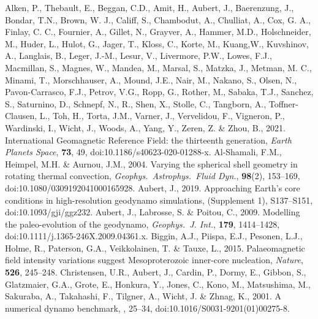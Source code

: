 \begin{thebibliography}{}
%
Alken, P., Thebault, E., Beggan, C.D., Amit, H., Aubert, J., Baerenzung, J., Bondar, T.N., Brown, W. J., Califf, S., Chambodut, A., Chulliat, A., Cox, G. A., Finlay, C. C., Fournier, A., Gillet, N., Grayver, A., Hammer, M.D., Holschneider, M., Huder, L., Hulot, G., Jager, T., Kloss, C., Korte, M., Kuang,W., Kuvshinov, A., Langlais, B., Leger, J.-M., Lesur, V., Livermore, P.W., Lowes, F.J., Macmillan, S., Magnes, W., Mandea, M., Marsal, S., Matzka, J., Metman, M. C., Minami, T., Morschhauser, A., Mound, J.E., Nair, M., Nakano, S., Olsen, N., Pavon-Carrasco, F.J., Petrov, V.G., Ropp, G., Rother, M., Sabaka, T.J., Sanchez, S., Saturnino, D., Schnepf, N., R., Shen, X., Stolle, C., Tangborn, A., Toffner-Clausen, L., Toh, H., Torta, J.M., Varner, J., Vervelidou, F., Vigneron, P., Wardinski, I., Wicht, J., Woods, A., Yang, Y., Zeren, Z. \& Zhou, B., 2021. International Geomagnetic Reference Field: the thirteenth generation, {\it Earth Planets Space}, {\bf 73}, 49, doi:10.1186/s40623-020-01288-x.
%
Al-Shamali, F.M., Heimpel, M.H. \& Aurnou, J.M., 2004. Varying the spherical shell geometry in rotating thermal convection, {\it Geophys.\  Astrophys.\ Fluid Dyn.}, {\bf 98}(2), 153--169, doi:10.1080/0309192041000165928.
%
Aubert, J., 2019. Approaching Earth's core conditions in high-resolution geodynamo simulations, (Supplement 1), S137--S151, doi:10.1093/gji/ggz232.
%
Aubert, J., Labrosse, S. \& Poitou, C., 2009. Modelling the paleo-evolution of the geodynamo, {\it Geophys.\ J. Int.}, {\bf 179}, 1414--1428, doi:10.1111/j.1365-246X.2009.04361.x.
%
Biggin, A.J., Piispa, E.J., Pesonen, L.J., Holme, R., Paterson, G.A., Veikkolainen, T. \& Tauxe, L., 2015. Palaeomagnetic field intensity variations suggest Mesoproterozoic inner-core nucleation, {\it Nature}, {\bf 526}, 245–248.
%
Christensen, U.R., Aubert, J., Cardin, P., Dormy, E., Gibbon, S., Glatzmaier, G.A., Grote, E., Honkura, Y., Jones, C., Kono, M., Matsushima, M., Sakuraba, A., Takahashi, F., Tilgner, A., Wicht, J. \& Zhnag, K., 2001. A numerical dynamo benchmark, , 25--34, doi:10.1016/S0031-9201(01)00275-8.

\end{thebibliography}
